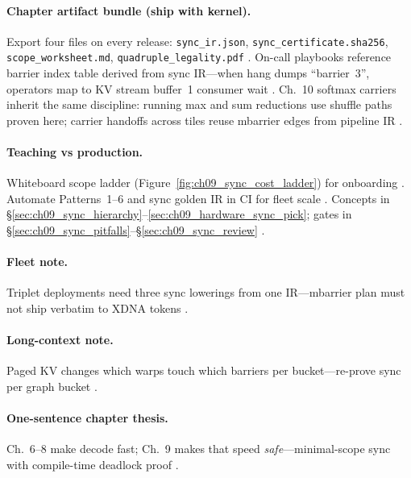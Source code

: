 \paragraph{Chapter artifact bundle (ship with kernel).}
Export four files on every release: \texttt{sync\_ir.json}, \texttt{sync\_certificate.sha256}, \texttt{scope\_worksheet.md}, \texttt{quadruple\_legality.pdf} \citep{yirage2026,chen2020compilerbasedhardw,taxbreak2026}.
On-call playbooks reference barrier index table derived from sync IR---when hang dumps ``barrier~3'', operators map to KV stream buffer~1 consumer wait \citep{shah2024flashattention3,semianalysis2024tma,patel2025llminference}.
Ch.~10 softmax carriers inherit the same discipline: running max and sum reductions use shuffle paths proven here; carrier handoffs across tiles reuse mbarrier edges from pipeline IR \citep{dao2022flashattention,memoryfloor2026,yirage2026}.

\paragraph{Teaching vs production.}
Whiteboard scope ladder (Figure~\ref{fig:ch09_sync_cost_ladder}) for onboarding \citep{shah2024flashattention3,dlbook}.
Automate Patterns~1--6 and sync golden IR in CI for fleet scale \citep{yirage2026,patel2025llminference,wu2024mirage,mpk2025}.
Concepts in \S\ref{sec:ch09_sync_hierarchy}--\ref{sec:ch09_hardware_sync_pick}; gates in \S\ref{sec:ch09_sync_pitfalls}--\S\ref{sec:ch09_sync_review} \citep{chen2020compilerbasedhardw,taxbreak2026}.

\paragraph{Fleet note.}
Triplet deployments need three sync lowerings from one IR---mbarrier plan must not ship verbatim to XDNA tokens \citep{amd2024xdna,patel2025llminference,yirage2026,nvidia2022hopper,chen2020compilerbasedhardw}.

\paragraph{Long-context note.}
Paged KV changes which warps touch which barriers per bucket---re-prove sync per graph bucket \citep{kwon2023vllm,dao2023flashdecoding,nvidia2024cudagraphs,yirage2026,shah2024flashattention3}.

\paragraph{One-sentence chapter thesis.}
Ch.~6--8 make decode fast; Ch.~9 makes that speed \emph{safe}---minimal-scope sync with compile-time deadlock proof \citep{dao2022flashattention,shah2024flashattention3,semianalysis2024tma,yirage2026,patel2025llminference,memoryfloor2026,taxbreak2026,chen2020compilerbasedhardw,mpk2025,wu2024mirage}.


